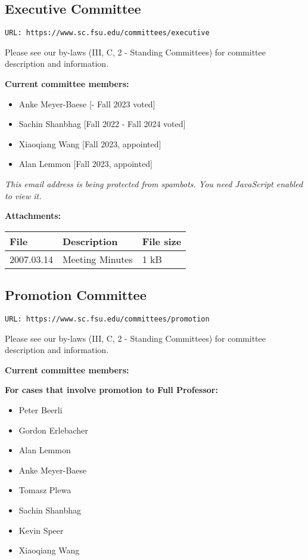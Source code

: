 \documentclass[12pt,a4paper]{article}
\begin{document}
\subsection{Executive Committee}
\texttt{URL: https://www.sc.fsu.edu/committees/executive}

Please see our by-laws (III, C, 2 - Standing Committees) for committee description and information.

\textbf{Current committee members:}
\begin{itemize}
    \item Anke Meyer-Baese [- Fall 2023 voted]
    \item Sachin Shanbhag [Fall 2022 - Fall 2024 voted]
    \item Xiaoqiang Wang [Fall 2023, appointed]
    \item Alan Lemmon [Fall 2023, appointed]
\end{itemize}

\textit{This email address is being protected from spambots. You need JavaScript enabled to view it.}

\vspace{1em}
\textbf{Attachments:}
\begin{table}[h!]
\centering
\begin{tabular}{|l|l|l|}
\hline
\textbf{File} & \textbf{Description} & \textbf{File size} \\ \hline
2007.03.14    & Meeting Minutes    & 1 kB               \\ \hline
\end{tabular}
\end{table}

\subsection{Promotion Committee}
\texttt{URL: https://www.sc.fsu.edu/committees/promotion}

Please see our by-laws (III, C, 2 - Standing Committees) for committee description and information.

\textbf{Current committee members:}

\vspace{1em}
\textbf{For cases that involve promotion to Full Professor:}
\begin{itemize}
    \item Peter Beerli
    \item Gordon Erlebacher
    \item Alan Lemmon
    \item Anke Meyer-Baese
    \item Tomasz Plewa
    \item Sachin Shanbhag
    \item Kevin Speer
    \item Xiaoqiang Wang
\end{itemize}
\end{document}

